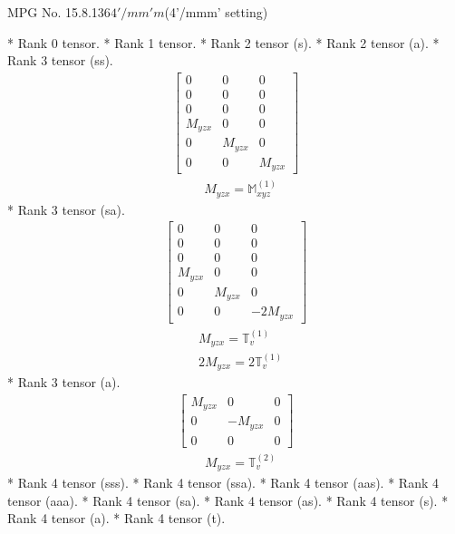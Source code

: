 \documentclass[fleqn,8pt,landscape]{jsarticle}
\begin{document}
\setcounter{MaxMatrixCols}{32}

\renewcommand{\tablename}{Table~}
\renewcommand{\figurename}{Figure~}
\begin{center}
\LARGE
MPG No. 15.8.136\quad$4'/mm'm$\quad(4'/mmm' setting)
\end{center}
* Rank 0 tensor.
* Rank 1 tensor.
* Rank 2 tensor (s).
* Rank 2 tensor (a).
* Rank 3 tensor (ss).
\begin{align*}
\begin{bmatrix} 0 & 0 & 0 \\ 0 & 0 & 0 \\ 0 & 0 & 0 \\ M_{yzx} & 0 & 0 \\ 0 & M_{yzx} & 0 \\ 0 & 0 & M_{yzx} \end{bmatrix}
\end{align*}
\begin{align*}
& M_{yzx} = \mathbb{M}_{xyz}^{(1)}
\end{align*}
* Rank 3 tensor (sa).
\begin{align*}
\begin{bmatrix} 0 & 0 & 0 \\ 0 & 0 & 0 \\ 0 & 0 & 0 \\ M_{yzx} & 0 & 0 \\ 0 & M_{yzx} & 0 \\ 0 & 0 & - 2 M_{yzx} \end{bmatrix}
\end{align*}
\begin{align*}
& M_{yzx} = \mathbb{T}_{v}^{(1)} \\
& 2 M_{yzx} = 2 \mathbb{T}_{v}^{(1)}
\end{align*}
* Rank 3 tensor (a).
\begin{align*}
\begin{bmatrix} M_{yzx} & 0 & 0 \\ 0 & - M_{yzx} & 0 \\ 0 & 0 & 0 \end{bmatrix}
\end{align*}
\begin{align*}
& M_{yzx} = \mathbb{T}_{v}^{(2)}
\end{align*}
* Rank 4 tensor (sss).
* Rank 4 tensor (ssa).
* Rank 4 tensor (aas).
* Rank 4 tensor (aaa).
* Rank 4 tensor (sa).
* Rank 4 tensor (as).
* Rank 4 tensor (s).
* Rank 4 tensor (a).
* Rank 4 tensor (t).
\end{document}
